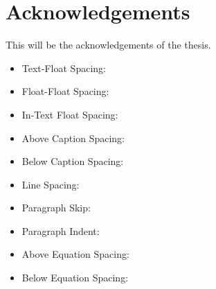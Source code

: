 \chapter*{Acknowledgements} %
This will be the acknowledgements of the thesis.

\begin{itemize}
    \item Text-Float Spacing: \the\textfloatsep
    \item Float-Float Spacing: \the\floatsep
    \item In-Text Float Spacing: \the\intextsep
    \item Above Caption Spacing: \the\abovecaptionskip
    \item Below Caption Spacing: \the\belowcaptionskip
    \item Line Spacing: \the\baselineskip
    \item Paragraph Skip: \the\parskip
    \item Paragraph Indent: \the\parindent
    \item Above Equation Spacing: \the\abovedisplayskip
    \item Below Equation Spacing: \the\belowdisplayskip
\end{itemize}